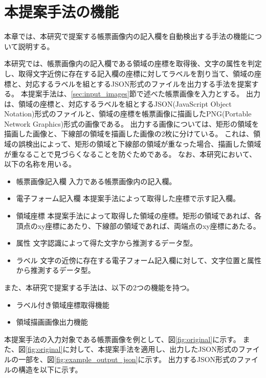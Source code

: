 \chapter{本提案手法の機能}\label{cha:Function}
本章では、本研究で提案する帳票画像内の記入欄を自動検出する手法の機能について説明する。

本研究では、帳票画像内の記入欄である領域の座標を取得後、文字の属性を判定し、取得文字近傍に存在する記入欄の座標に対してラベルを割り当て、領域の座標と、対応するラベルを組とするJSON形式のファイルを出力する手法を提案する。
本提案手法は、\ref{sec:input_images}節で述べた帳票画像を入力とする。
出力は、領域の座標と、対応するラベルを組とするJSON(JavaScript Object Notation)形式のファイルと、領域の座標を帳票画像に描画したPNG(Portable Network Graphics)形式の画像である。
出力する画像については、矩形の領域を描画した画像と、下線部の領域を描画した画像の2枚に分けている。
これは、領域の誤検出によって、矩形の領域と下線部の領域が重なった場合、描画した領域が重なることで見づらくなることを防ぐためである。
なお、本研究において、以下の名称を用いる。

\begin{itemize}
    \item 帳票画像記入欄
          入力である帳票画像内の記入欄。
    \item 電子フォーム記入欄
          本提案手法によって取得した座標で示す記入欄。
    \item 領域座標
          本提案手法によって取得した領域の座標。矩形の領域であれば、各頂点のxy座標にあたり、下線部の領域であれば、両端点のxy座標にあたる。
    \item 属性
          文字認識によって得た文字から推測するデータ型。
    \item ラベル
          文字の近傍に存在する電子フォーム記入欄に対して、文字位置と属性から推測するデータ型。
\end{itemize}

また、本研究で提案する手法は、以下の2つの機能を持つ。

\begin{itemize}
    \item ラベル付き領域座標取得機能
    \item 領域描画画像出力機能
\end{itemize}

本提案手法の入力対象である帳票画像を例として、図\ref{fig:original}に示す。
また、図\ref{fig:original}に対して、本提案手法を適用し、出力したJSON形式のファイルの一部を、図\ref{fig:example_output_json}に示す。
出力するJSON形式のファイルの構造を以下に示す。

